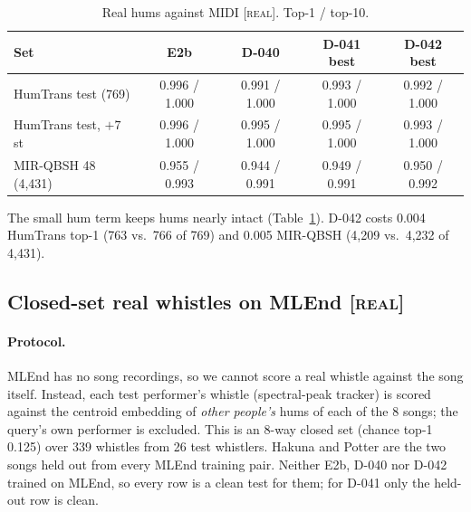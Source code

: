 \documentclass[11pt]{article}
\newcommand{\real}{\textsc{[real]}}
\newcommand{\st}{\,st}
\begin{document}
\begin{table}[t]
\centering
\caption{Real hums against MIDI \real. Top-1 / top-10.}
\label{tab:hum}
\small
\begin{tabular}{lcccc}
\toprule
Set & E2b & D-040 & D-041 best & D-042 best \\
\midrule
HumTrans test (769) & 0.996 / 1.000 & 0.991 / 1.000 & 0.993 / 1.000 & 0.992 / 1.000 \\
HumTrans test, $+7$\st & 0.996 / 1.000 & 0.995 / 1.000 & 0.995 / 1.000 & 0.993 / 1.000 \\
MIR-QBSH 48 (4,431) & 0.955 / 0.993 & 0.944 / 0.991 & 0.949 / 0.991 & 0.950 / 0.992 \\
\bottomrule
\end{tabular}
\end{table}

The small hum term keeps hums nearly intact (Table~\ref{tab:hum}). D-042 costs 0.004 HumTrans top-1 (763 vs.\ 766 of 769) and 0.005 MIR-QBSH (4,209 vs.\ 4,232 of 4,431).

\subsection{Closed-set real whistles on MLEnd \real}\label{sec:mlend}

\paragraph{Protocol.} MLEnd has no song recordings, so we cannot score a real whistle against the song itself. Instead, each test performer's whistle (spectral-peak tracker) is scored against the centroid embedding of \emph{other people's} hums of each of the 8 songs; the query's own performer is excluded. This is an 8-way closed set (chance top-1 0.125) over 339 whistles from 26 test whistlers. Hakuna and Potter are the two songs held out from every MLEnd training pair. Neither E2b, D-040 nor D-042 trained on MLEnd, so every row is a clean test for them; for D-041 only the held-out row is clean.
\end{document}
